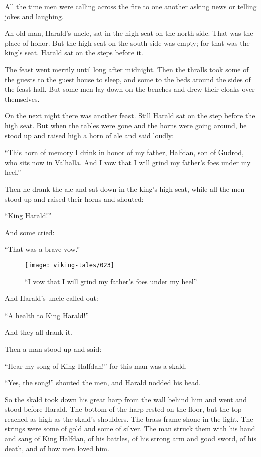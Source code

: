 All the time men were calling across the fire to one another asking news
or telling jokes and laughing.

An old man, Harald's uncle, sat in the high seat on the north side. That
was the place of honor. But the high seat on the south side was empty;
for that was the king's seat. Harald sat on the steps before it.

The feast went merrily until long after midnight. Then the thralls took
some of the guests to the guest house to sleep, and some to the beds
around the sides of the feast hall. But some men lay down on the benches
and drew their cloaks over themselves.

On the next night there was another feast. Still Harald sat on the step
before the high seat. But when the tables were gone and the horns were
going around, he stood up and raised high a horn of ale and said loudly:

``This horn of memory I drink in honor of my father, Halfdan, son of
Gudrod, who sits now in Valhalla. And I vow that I will grind my
father's foes under my heel.''

Then he drank the ale and sat down in the king's high seat, while all
the men stood up and raised their horns and shouted:

``King Harald!''

And some cried:

``That was a brave vow.''

\begin{figure}[ht]
    \centering
    \texttt{[image: viking-tales/023]}
    \caption{``I vow that I will grind my father's foes under my heel''}
\end{figure}

And Harald's uncle called out:

``A health to King Harald!''

And they all drank it.

Then a man stood up and said:

``Hear my song of King Halfdan!'' for this man was a skald.

``Yes, the song!'' shouted the men, and Harald nodded his head.

So the skald took down his great harp from the wall behind him and went
and stood before Harald. The bottom of the harp rested on the floor, but
the top reached as high as the skald's shoulders. The brass frame shone
in the light. The strings were some of gold and some of silver. The man
struck them with his hand and sang of King Halfdan, of his battles, of
his strong arm and good sword, of his death, and of how men loved him.

